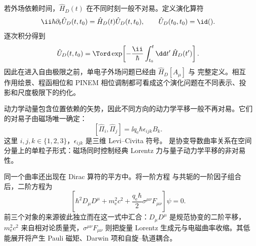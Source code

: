 若外场依赖时间，$\hat H_D(t)$ 在不同时刻一般不对易。定义演化算符
\begin{equation*}
 \ii\hbar\partial_t\hat U_D(t,t_0)=\hat H_D(t)\hat U_D(t,t_0),
 \qquad \hat U_D(t_0,t_0)=\id().
\end{equation*}
逐次积分得到
\begin{equation}
 \hat U_D(t,t_0)=
 \Tord\exp\!\left[-\frac{\ii}{\hbar}
 \int_{t_0}^{t}\dd t'\,\hat H_D(t')\right].
 \label{eq:dirac-time-evolution}
\end{equation}
因此在进入自由极限之前，单电子外场问题已经由 $\hat H_D[A_\mu]$ 与  完整定义。相互作用绘景、程函相位和 PINEM 相位调制都可看成这个演化问题在不同表示、投影和尺度极限下的约化。



动力学动量包含位置依赖的矢势，因此不同方向的动力学平移一般不再对易。它们的对易子由磁场唯一确定：
\begin{equation}
 {
 [\hat\Pi_i,\hat\Pi_j]
 =\ii q_{\mathrm e}\hbar\epsilon_{ijk}B_k.}
 \label{eq:pi-commutator}
\end{equation}
这里 $i,j,k\in\{1,2,3\}$，$\epsilon_{ijk}$ 是三维 Levi--Civita 符号。 是协变导数曲率关系在空间分量上的单粒子形式：磁场同时控制经典 Lorentz 力与量子动力学平移的非对易性。

同一个曲率还出现在 Dirac 算符的平方中。将一阶方程  与共轭的一阶因子组合后，二阶方程为
\begin{equation}
 {
 \left[
 \hbar^2D_\mu D^\mu+m_{\mathrm e}^2c^2
 +\frac{q_{\mathrm e}\hbar}{2}\sigma^{\mu\nu}F_{\mu\nu}
 \right]\psi=0.
 }
 \label{eq:dirac-squared}
\end{equation}
前三个对象的来源彼此独立而在这一式中汇合：$D_\mu D^\mu$ 是规范协变的二阶平移，$m_{\mathrm e}^2c^2$ 来自相对论质量壳，$\sigma^{\mu\nu}F_{\mu\nu}$ 则把旋量 Lorentz 生成元与电磁曲率收缩。其低能展开将产生 Pauli 磁矩、Darwin 项和自旋--轨道耦合。

